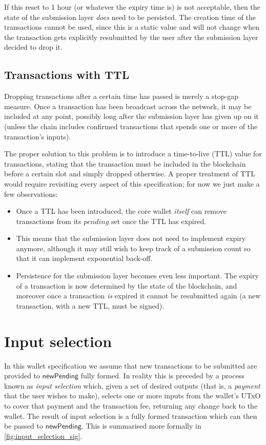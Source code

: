 \documentclass{article}
\theoremstyle{definition}{
  \newtheorem{lemma}{Lemma}[section] %
  \newtheorem{definition}[lemma]{Definition}
}
\theoremstyle{theorem}{
  \newtheorem{invariant}[lemma]{Invariant}
  \newtheorem{proofobligation}[lemma]{Proof Obligation}
}
\numberwithin{equation}{lemma}
\begin{document}
If this reset to 1 hour (or whatever the expiry time is) is not acceptable,
then the state of the submission layer \emph{does} need to be persisted.
The creation time of the transactions cannot be used, since this is a static
value and will not change when the transaction gets explicitly resubmitted
by the user after the submission layer decided to drop it.

\subsection{Transactions with TTL}
\label{sec:TTL}

Dropping transactions after a certain time has passed is merely a stop-gap
measure. Once a transaction has been broadcast across the network, it may be
included at any point, possibly long after the submission layer has given up on
it (unless the chain includes confirmed transactions that spends one or more of
the transaction's inputs).

The proper solution to this problem is to introduce a time-to-live (TTL) value
for transactions, stating that the transaction must be included in the
blockchain before a certain slot and simply dropped otherwise. A proper treatment
of TTL would require revisiting every aspect of this specification; for now
we just make a few observations:

\begin{itemize}
\item Once a TTL has been introduced, the core wallet \emph{itself} can remove
transactions from its $\mathit{pending}$ set once the TTL has expired.
\item This means that the submission layer does not need to implement expiry
anymore, although it may still wish to keep track of a submission count so that
it can implement exponential back-off.
\item Persistence for the submission layer becomes even less important.
The expiry of a transaction is now determined by the state of the blockchain,
and moreover once a transaction \emph{is} expired it cannot be resubmitted again
(a new transaction, with a new TTL, must be signed).
\end{itemize}

\section{Input selection}
\label{sec:input_selection}

In this wallet specification we assume that new transactions to be submitted are
provided to $\mathsf{newPending}$ fully formed. In reality this is preceded by a
process known as \emph{input selection} which, given a set of desired outputs
(that is, a \emph{payment} that the user wishes to make), selects one or more
inputs from the wallet's UTxO to cover that payment and the transaction fee,
returning any change back to the wallet. The result of input selection is a
fully formed transaction which can then be passed to $\mathsf{newPending}$. This
is summarised more formally in \cref{fig:input_selection_sig}.
\end{document}
